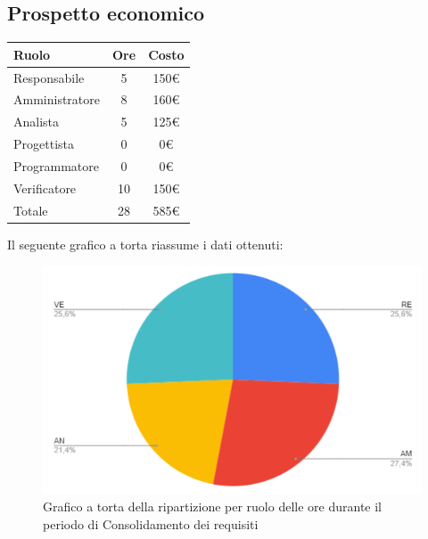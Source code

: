 {{{\subsection{Prospetto economico}\label{PreventivoFaseDiConsolidamentoDeiRequisitiProspettoEconomico}
\quad
\def\tabularxcolumn#1{m{#1}}
{
	\begin{center}
		\renewcommand{\arraystretch}{1.4}
		\begin{tabularx}{7cm}{|X|c|c|}
			\hline
			\rowcolor{airforceblue}
			\textbf{Ruolo} & \textbf{Ore} & \textbf{Costo}\\
			\hline
			Responsabile & 5 & 150\euro\\
			\hline
			Amministratore & 8 & 160\euro\\
			\hline
			Analista & 5 & 125\euro\\
			\hline
			Progettista & 0 & 0\euro\\
			\hline
			Programmatore & 0 & 0\euro\\
			\hline
			Verificatore & 10 & 150\euro\\
			\hline
			Totale & 28 & 585\euro\\
			\hline
		\end{tabularx}
	\end{center}
Il seguente grafico a torta riassume i dati ottenuti:
\begin{figure}[!ht]
	\begin{center}
		\includegraphics[width=0.8\linewidth]{../immagini/pdp/torta_consolidamento_requisiti.png}
		\caption{Grafico a torta della ripartizione per ruolo delle ore durante il periodo di Consolidamento dei requisiti}
	\end{center}
\end{figure}

}}}}
